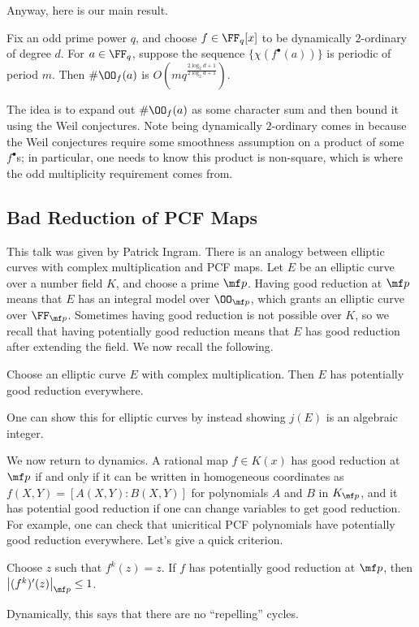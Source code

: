 \documentclass{article}
\begin{document}
Anyway, here is our main result.
\begin{theorem}
	Fix an odd prime power $q$, and choose $f\in\FF_q[x]$ to be dynamically $2$-ordinary of degree $d$. For $a\in\FF_q$, suppose the sequence $\{\chi(f^\bullet(a))\}$ is periodic of period $m$. Then $\#\OO_f(a)$ is $O\left(mq^{\frac{2\log_2d+1}{2\log_2d+1}}\right)$.
\end{theorem}
The idea is to expand out $\#\OO_f(a)$ as some character sum and then bound it using the Weil conjectures. Note being dynamically $2$-ordinary comes in because the Weil conjectures require some smoothness assumption on a product of some $f^\bullet$s; in particular, one needs to know this product is non-square, which is where the odd multiplicity requirement comes from.

\subsection{Bad Reduction of PCF Maps}
This talk was given by Patrick Ingram. There is an analogy between elliptic curves with complex multiplication and PCF maps. Let $E$ be an elliptic curve over a number field $K$, and choose a prime $\mf p$. Having good reduction at $\mf p$ means that $E$ has an integral model over $\OO_{\mf p}$, which grants an elliptic curve over $\FF_{\mf p}$. Sometimes having good reduction is not possible over $K$, so we recall that having potentially good reduction means that $E$ has good reduction after extending the field. We now recall the following.
\begin{theorem}
	Choose an elliptic curve $E$ with complex multiplication. Then $E$ has potentially good reduction everywhere.
\end{theorem}
One can show this for elliptic curves by instead showing $j(E)$ is an algebraic integer.

We now return to dynamics. A rational map $f\in K(x)$ has good reduction at $\mf p$ if and only if it can be written in homogeneous coordinates as $f(X,Y)=[A(X,Y):B(X,Y)]$ for polynomials $A$ and $B$ in $K_{\mf p}$, and it has potential good reduction if one can change variables to get good reduction. For example, one can check that unicritical PCF polynomials have potentially good reduction everywhere. Let's give a quick criterion.
\begin{lemma}
	Choose $z$ such that $f^k(z)=z$. If $f$ has potentially good reduction at $\mf p$, then $\left|(f^k)'(z)\right|_{\mf p}\le1$.
\end{lemma}
Dynamically, this says that there are no ``repelling'' cycles.
\end{document}
